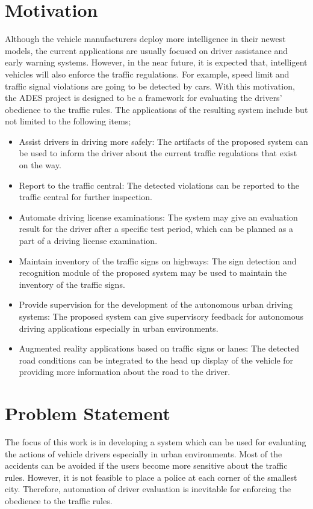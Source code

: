 \documentclass[a4paper,oneside,12pt]{report}
\begin{document}
\section{Motivation}
Although the vehicle manufacturers deploy more intelligence in their newest models, the current applications are usually focused on driver assistance and early warning systems. However, in the near future, it is expected that, intelligent vehicles will also enforce the traffic regulations. For example, speed limit and traffic signal violations are going to be detected by cars. With this motivation, the ADES project is designed to be a framework for evaluating the drivers' obedience to the traffic rules. The applications of the resulting system include but not limited to the following items;
\begin{itemize}
	\item Assist drivers in driving more safely: The artifacts of the proposed system can be used to inform the driver about the current traffic regulations that exist on the way.
	\item Report to the traffic central: The detected violations can be reported to the traffic central for further inspection.
	\item Automate driving license examinations: The system may give an evaluation result for the driver after a specific test period, which can be planned as a part of a driving license examination.
	\item Maintain inventory of the traffic signs on highways: The sign detection and recognition module of the proposed system may be used to maintain the inventory of the traffic signs.
	\item Provide supervision for the development of the autonomous urban driving systems: The proposed system can give supervisory feedback for autonomous driving applications especially in urban environments.
	\item	Augmented reality applications based on traffic signs or lanes: The detected road conditions can be integrated to the head up display of the vehicle for providing more information about the road to the driver.
\end{itemize}

\section{Problem Statement}

The focus of this work is in developing a system which can be used for evaluating the actions of vehicle drivers especially in urban environments. Most of the accidents can be avoided if the users become more sensitive about the traffic rules. However, it is not feasible to place a police at each corner of the smallest city. Therefore, automation of driver evaluation is inevitable for enforcing the obedience to the traffic rules. 
\end{document}
